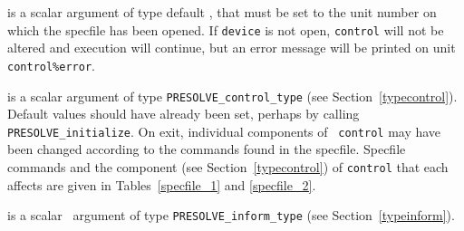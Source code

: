 \documentclass{galahad}
\newcommand{\packagename}{PRESOLVE}
\begin{document}
\begin{description}
 is a scalar \intentin argument of type default \integer,
that must be set to the unit number on which the specfile
has been opened. If {\tt device} is not open, {\tt control} will
not be altered and execution will continue, but an error message
will be printed on unit {\tt control\%error}.

 is a scalar \intentinout argument of type
{\tt \packagename\_control\_type} (see Section~\ref{typecontrol}).
Default values should have already been set, perhaps by calling
{\tt \packagename\_initialize}. On exit, individual components of {\tt
control} may have been changed according to the commands found in the
specfile. Specfile commands and  the component (see Section~\ref{typecontrol})
of {\tt control}  that each affects are given in
Tables~\ref{specfile_1} and \ref{specfile_2}.

 is a scalar \intentout\ argument of type
{\tt \packagename\_inform\_type} (see Section~\ref{typeinform}).
\end{description}
\end{document}
